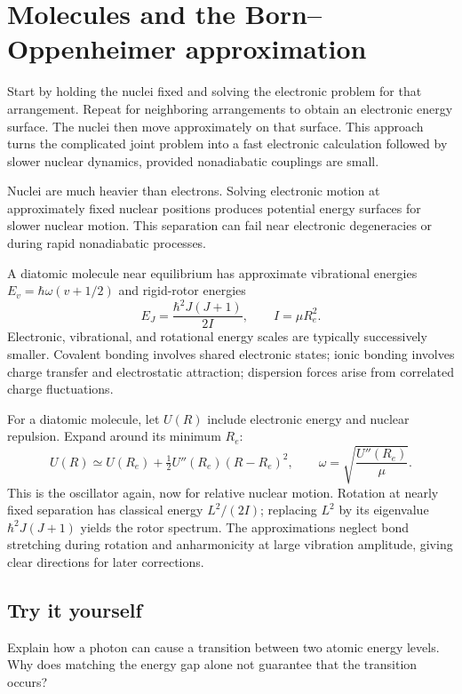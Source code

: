 \documentclass[11pt,oneside]{book}
\theoremstyle{reviewstyle}
\newcommand{\learningcheck}[1]{\subsection*{Try it yourself}\noindent #1\par}
\begin{document}
\section{Molecules and the Born--Oppenheimer approximation}
Start by holding the nuclei fixed and solving the electronic problem for that arrangement. Repeat for neighboring arrangements to obtain an electronic energy surface. The nuclei then move approximately on that surface. This approach turns the complicated joint problem into a fast electronic calculation followed by slower nuclear dynamics, provided nonadiabatic couplings are small.

Nuclei are much heavier than electrons. Solving electronic motion at approximately fixed nuclear positions produces potential energy surfaces for slower nuclear motion. This separation can fail near electronic degeneracies or during rapid nonadiabatic processes.

A diatomic molecule near equilibrium has approximate vibrational energies $E_v=\hbar\omega(v+1/2)$ and rigid-rotor energies
\begin{equation}E_J=\frac{\hbar^2J(J+1)}{2I},\qquad I=\mu R_e^2.\end{equation}
Electronic, vibrational, and rotational energy scales are typically successively smaller. Covalent bonding involves shared electronic states; ionic bonding involves charge transfer and electrostatic attraction; dispersion forces arise from correlated charge fluctuations.

For a diatomic molecule, let $U(R)$ include electronic energy and nuclear repulsion. Expand around its minimum $R_e$:
\begin{equation}
U(R)\simeq U(R_e)+\tfrac12U''(R_e)(R-R_e)^2,
\qquad \omega=\sqrt{\frac{U''(R_e)}\mu}.
\end{equation}
This is the oscillator again, now for relative nuclear motion. Rotation at nearly fixed separation has classical energy $L^2/(2I)$; replacing $L^2$ by its eigenvalue $\hbar^2J(J+1)$ yields the rotor spectrum. The approximations neglect bond stretching during rotation and anharmonicity at large vibration amplitude, giving clear directions for later corrections.

\learningcheck{Explain how a photon can cause a transition between two atomic energy levels. Why does matching the energy gap alone not guarantee that the transition occurs?}
\end{document}
